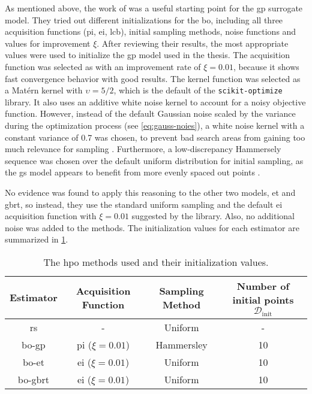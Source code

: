 As mentioned above, the work of \citet{yin2021bayesian} was a useful starting point for the \gls{gp} surrogate model. They tried out different initializations for the \gls{bo}, including all three acquisition functions (\gls{pi}, \gls{ei}, \gls{lcb}), initial sampling methods, noise functions and values for improvement $\xi$. After reviewing their results, the most appropriate values were used to initialize the \gls{gp} model used in the thesis. The acquisition function was selected as  with an improvement rate of $\xi = 0.01$, because it shows fast convergence behavior with good results. The kernel function was selected as a Matérn kernel with $\upsilon=5/2$, which is the default of the \texttt{scikit-optimize} library. It also uses an additive white noise kernel to account for a noisy objective function. However, instead of the default Gaussian noise scaled by the variance during the optimization process (see \cref{eq:gauss-noies}), a white noise kernel with a constant variance of 0.7 was chosen, to prevent bad search areas from gaining too much relevance for sampling \cite{yin2021bayesian}.
Furthermore, a low-discrepancy Hammersely sequence was chosen over the default uniform distribution for initial sampling, as the \gls{gs} model appears to benefit from more evenly spaced out points \cite{cervellera2013learning}. 

No evidence was found to apply this reasoning to the other two models, \gls{et} and \gls{gbrt}, so instead, they use the standard uniform sampling and the default \gls{ei} acquisition function with $\xi = 0.01$ suggested by the library. Also, no additional noise was added to the methods. The initialization values for each estimator are summarized in \cref{tab:opt-init}.

\begin{table}
	\centering
	 \caption[The \gls{hpo} methods used and their initialization values]{The \gls{hpo} methods used and their initialization values.}
	\label{tab:opt-init}
	\begin{tabular}{c|c|c|c}
		Estimator & Acquisition Function & Sampling Method & Number of initial points $\mathcal{D}_\text{init}$ \\
		\hline
		\gls{rs} & - & Uniform & -\\
		\gls{bo}-\gls{gp} & \gls{pi} ($\xi=0.01$) & Hammersley & 10 \\
		\gls{bo}-\gls{et} & \gls{ei} ($\xi=0.01$) & Uniform & 10 \\
		\gls{bo}-\gls{gbrt} & \gls{ei} ($\xi=0.01$) & Uniform & 10 \\
	\end{tabular}
\end{table}

